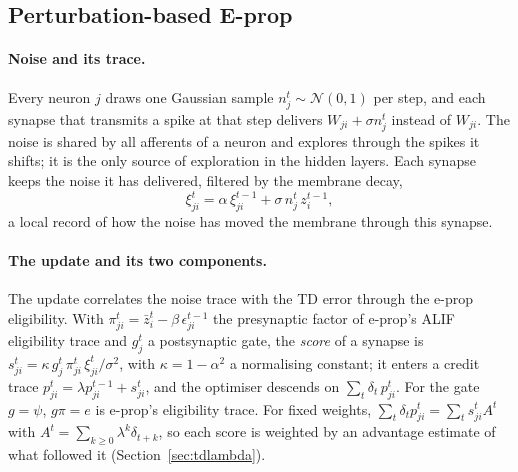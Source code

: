\documentclass[10pt,twocolumn]{article}
\begin{document}
\subsection{Perturbation-based E-prop}
\label{sec:distributed}

\paragraph{Noise and its trace.}
Every neuron $j$ draws one Gaussian sample $n^t_j\sim\mathcal{N}(0,1)$ per step,
and each synapse that transmits a spike at that step delivers $W_{ji}+\sigma
n^t_j$ instead of $W_{ji}$. The noise is shared by all afferents of a neuron and
explores through the spikes it shifts; it is the only source of exploration in
the hidden layers. Each synapse keeps the noise it has delivered, filtered by the
membrane decay,
\begin{equation}
\xi^t_{ji}=\alpha\,\xi^{t-1}_{ji}+\sigma\,n^t_j\,z^{t-1}_i ,
\label{eq:perturbation-trace}
\end{equation}
a local record of how the noise has moved the membrane through this synapse.

\paragraph{The update and its two components.}
The update correlates the noise trace with the TD error through the
e-prop eligibility. With $\pi^t_{ji}=\bar z^t_i-\beta\,\epsilon^{t-1}_{ji}$ the
presynaptic factor of e-prop's ALIF eligibility trace and $g^t_j$ a postsynaptic
gate, the \emph{score} of a synapse is
$s^t_{ji}=\kappa\,g^t_j\,\pi^t_{ji}\,\xi^t_{ji}/\sigma^2$, with
$\kappa=1-\alpha^2$ a normalising constant; it enters a credit trace
$p^t_{ji}=\lambda p^{t-1}_{ji}+s^t_{ji}$, and the optimiser descends on
$\sum_t\delta_t\,p^t_{ji}$. For the gate $g=\psi$, $g\pi=e$ is e-prop's
eligibility trace. For fixed weights,
$\sum_t\delta_tp^t_{ji}=\sum_t s^t_{ji}A^t$ with
$A^t=\sum_{k\ge0}\lambda^k\delta_{t+k}$, so each score is weighted by an advantage
estimate of what followed it (Section~\ref{sec:tdlambda}).
\end{document}
